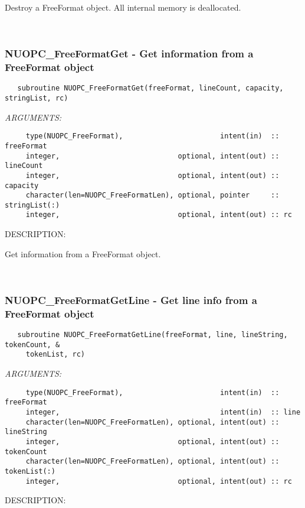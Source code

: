      Destroy a FreeFormat object. All internal memory is deallocated. 
 
\mbox{}\hrulefill\ 
 
\subsubsection [NUOPC\_FreeFormatGet] {NUOPC\_FreeFormatGet - Get information from a FreeFormat object}


\begin{verbatim}   subroutine NUOPC_FreeFormatGet(freeFormat, lineCount, capacity, stringList, rc)\end{verbatim}{\em ARGUMENTS:}
\begin{verbatim}     type(NUOPC_FreeFormat),                       intent(in)  :: freeFormat
     integer,                            optional, intent(out) :: lineCount
     integer,                            optional, intent(out) :: capacity
     character(len=NUOPC_FreeFormatLen), optional, pointer     :: stringList(:)
     integer,                            optional, intent(out) :: rc\end{verbatim}
{\sf DESCRIPTION:\\ }


     Get information from a FreeFormat object. 
 
\mbox{}\hrulefill\ 
 
\subsubsection [NUOPC\_FreeFormatGetLine] {NUOPC\_FreeFormatGetLine - Get line info from a FreeFormat object}


\begin{verbatim}   subroutine NUOPC_FreeFormatGetLine(freeFormat, line, lineString, tokenCount, &
     tokenList, rc)\end{verbatim}{\em ARGUMENTS:}
\begin{verbatim}     type(NUOPC_FreeFormat),                       intent(in)  :: freeFormat
     integer,                                      intent(in)  :: line
     character(len=NUOPC_FreeFormatLen), optional, intent(out) :: lineString
     integer,                            optional, intent(out) :: tokenCount
     character(len=NUOPC_FreeFormatLen), optional, intent(out) :: tokenList(:)
     integer,                            optional, intent(out) :: rc\end{verbatim}
{\sf DESCRIPTION:\\ }


